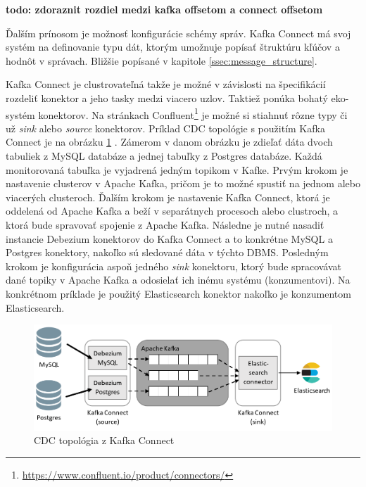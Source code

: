 \textbf{todo: zdoraznit rozdiel medzi kafka offsetom a connect offsetom}

Ďalším prínosom je možnosť konfigurácie schémy správ. Kafka Connect má svoj systém na definovanie typu dát, ktorým umožnuje popísať štruktúru kľúčov a hodnôt v správach. Bližšie popísané v kapitole \ref{ssec:message_structure}.

Kafka Connect je clustrovateľná takže je možné v závislosti na špecifikácií rozdeliť konektor a jeho tasky medzi viacero uzlov. Taktiež ponúka bohatý eko-systém konektorov. Na stránkach Confluent\footnote{\url{https://www.confluent.io/product/connectors/}} je možné si stiahnuť rôzne typy či už \textit{sink} alebo \textit{source} konektorov.
Príklad CDC topológie s použitím Kafka Connect je na obrázku \ref{fig:CDC_topology} \cite{debezium:devoxx}. Zámerom v danom obrázku je zdieľať dáta dvoch tabuliek z MySQL databáze a jednej tabuľky z Postgres databáze. Každá monitorovaná tabuľka je vyjadrená jedným topikom v Kafke. Prvým krokom je nastavenie clusterov v Apache Kafka, pričom je to možné spustiť na jednom alebo viacerých clusteroch. Ďalším krokom je nastavenie Kafka Connect, ktorá je oddelená od Apache Kafka a beží v separátnych procesoch alebo clustroch, a ktorá bude spravovať spojenie z Apache Kafka. Následne je nutné nasadiť instancie Debezium konektorov do Kafka Connect a to konkrétne MySQL a Postgres konektory, nakoľko sú sledované dáta v týchto DBMS. Posledným krokom je konfigurácia aspoň jedného \textit{sink} konektoru, ktorý bude spracovávat dané topiky v Apache Kafka a odosielať ich inému systému (konzumentovi). Na konkrétnom príklade je použitý Elasticsearch konektor nakoľko je konzumentom Elasticsearch.

\begin{figure}[H]
\begin{center}
\includegraphics[width=15cm]{figures/CDC_topology.PNG}
\caption{CDC topológia z Kafka Connect}
\label{fig:CDC_topology}
\end{center}
\end{figure}


